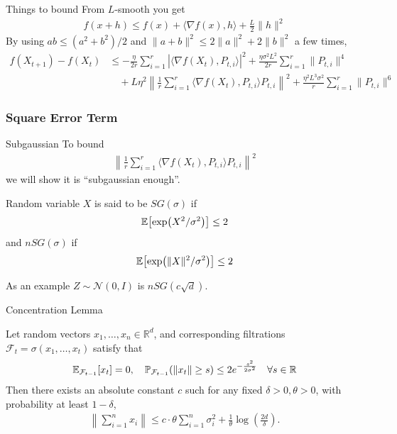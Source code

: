 \documentclass[10pt]{beamer}
\def\mbb#1{\mathbb{#1}}
\def \R{\mbb{R}}
\newcommand{\mg}[1]{\| #1 \|}
\newcommand{\E}{\mathbb{E}\qty}
\newcommand{\Et}{\mathbb{E}_{\mathcal F_{t-1}} \qty}
\newcommand{\Pt}{\mathbb{P}_{\mathcal F_{t-1}} \qty}
\renewcommand{\grad}{\nabla}
\newcommand{\1}{\mathbbm{1}}
\begin{document}
\begin{frame}{Things to bound}
    From $L$-smooth you get 
    \begin{align*}
        f(x+h) \leq f(x) + \langle \grad f(x) , h \rangle + \frac{L}{2} \mg{h}^2
    \end{align*}
    By using $ab \leq (a^2+b^2)/2$ and $\mg{a+b}^2 \leq 2\mg{a}^2 + 2\mg{b}^2$ a few times,
    \begin{align*}
        f(X_{t+1}) - f(X_t) &\leq -\frac{\eta}{2r} \sum_{i=1}^r |\langle \grad f(X_t), P_{t,i} \rangle|^2 + \frac{\eta \sigma^2 L^2}{2r} \sum_{i=1}^r \mg{P_{t,i}}^4 \\
        &\quad + L\eta^2 \left \| \frac{1}{r} \sum_{i=1}^r  \langle \grad f(X_t), P_{t,i} \rangle P_{t,i} \right\|^2 + \frac{\eta^2 L^3 \sigma^2}{r} \sum_{i=1}^r \mg{P_{t,i}}^6
    \end{align*}
\end{frame}

\subsubsection{Square Error Term}
\begin{frame}{Subgaussian}
    To bound \begin{align*}
        \left \| \frac{1}{r} \sum_{i=1}^r  \langle \grad f(X_t), P_{t,i} \rangle P_{t,i} \right\|^2
    \end{align*}
    we will show it is ``subgaussian enough''.  
    \begin{definition}
    Random variable $X$ is said to be $SG(\sigma)$ if
    \begin{align*}
        \E[\exp(X^2/\sigma^2)] \leq 2
    \end{align*} 
    and $nSG(\sigma)$ if
    \begin{align*}
        \E[\exp(\mg{X}^2/\sigma^2)] \leq 2
    \end{align*}   
    \end{definition}
    As an example $Z \sim \mathcal N(0,I)$ is $nSG(c\sqrt{d})$.
\end{frame}

\begin{frame}{Concentration Lemma}
    \begin{lemma}
        Let random vectors $x_1, \ldots, x_n \in \R^d$, and corresponding filtrations $\mathcal F_t = \sigma(x_1, \ldots, x_t)$ satisfy that 
        \begin{align*}
            \Et[x_t] = 0, \quad \Pt(\mg{x_t} \geq s) \leq 2e^{-\frac{s^2}{2\sigma^2}} \quad \forall s \in \R
        \end{align*}
        Then there exists an absolute constant $c$ such for any fixed $\delta > 0, \theta > 0$, with probability at least $1-\delta$,
        \begin{align*}
            \left\|\sum_{i=1}^n x_i\right\| \leq c\cdot \theta \sum_{i=1}^n \sigma_i^2 + \frac{1}{\theta} \log(\frac{2d}{\delta}).
        \end{align*}
\end{lemma}
\end{frame}
\end{document}
